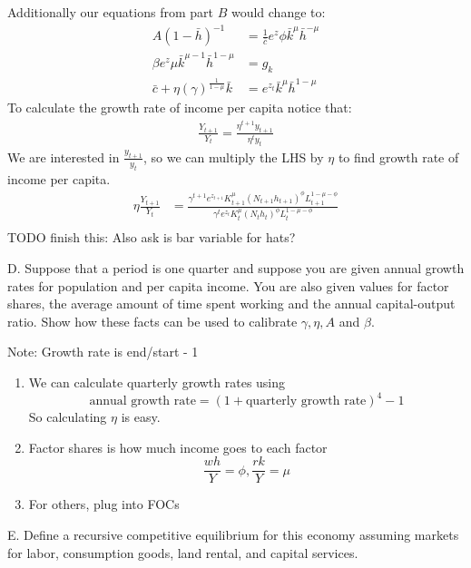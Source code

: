 \documentclass[answers]{exam}
\begin{document}
\begin{questions}
\begin{solution}
    Additionally our equations from part $B$ would change to:
    \begin{align*}
        A(1-\bar{h})^{-1} &= \frac{1}{\bar{c}} e^{z} \phi \bar{k}^\mu \bar{h}^{-\mu}\\
        \beta e^{z} \mu \bar{k}^{\mu-1} \bar{h}^{1-\mu} &= g_k\\
        \bar{c} + \eta  (\gamma)^\frac{1}{1-\mu} \bar{k} &= e^{z_t} \bar{k}^\mu \bar{h}^{1-\mu}
    \end{align*}
    To calculate the growth rate of income per capita notice that:
    \begin{align*} 
        \frac{Y_{t+1}}{Y_t} = \frac{\eta^{t+1} y_{t+1}}{\eta^t y_t}
    \end{align*}
    We are interested in $\frac{y_{t+1}}{y_t}$, so we can multiply the LHS by $\eta$ to find growth rate of income per capita.
    \begin{align*} 
        \eta \frac{Y_{t+1}}{Y_t} &= \frac{\gamma^{t+1} e^{z_{t+1}} K_{t+1}^{\mu}\left(N_{t+1} h_{t+1}\right)^{\phi} L_{t+1}^{1-\mu-\phi}}{\gamma^{t} e^{z_{t}} K_{t}^{\mu}\left(N_{t} h_{t}\right)^{\phi} L_{t}^{1-\mu-\phi}}\\
    \end{align*}
    TODO finish this: Also ask is bar variable for hats?
\end{solution}
D. Suppose that a period is one quarter and suppose you are given annual growth rates for population and per capita income. You are also given values for factor shares, the average amount of time spent working and the annual capital-output ratio. Show how these facts can be used to calibrate $\gamma, \eta, A$ and $\beta$.
\begin{solution} Note: Growth rate is end/start - 1
    \begin{enumerate}
        \item We can calculate quarterly growth rates using 
        $$\text{annual growth rate} = (1 + \text{quarterly growth rate})^4 - 1$$
        So calculating $\eta$ is easy.
        \item Factor shares is how much income goes to each factor
        $$\frac{wh}{Y} =\phi, \frac{rk}{Y} = \mu$$
        \item For others, plug into FOCs
    \end{enumerate}
\end{solution}
E. Define a recursive competitive equilibrium for this economy assuming markets for labor, consumption goods, land rental, and capital services.
\begin{solution}

\end{solution}
\end{questions}
\end{document}
